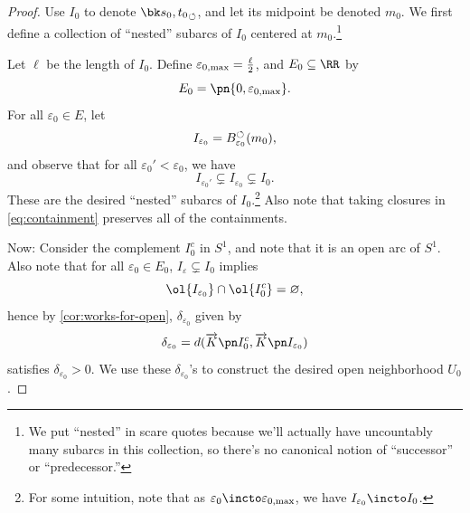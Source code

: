\begin{proof}
  Use $I_0$ to denote $\sbk{s_0, t_0}$, and let its midpoint be
  denoted $m_0$. We first define a collection of ``nested'' subarcs of
  $I_0$ centered at $m_0$.\footnote{We put ``nested'' in scare quotes
    because we'll actually have uncountably many subarcs in this
    collection, so there's no canonical notion of ``successor'' or
    ``predecessor.''}

  Let $\ell$ be the length of $I_0$. Define $\varepsilon_{0, {\rm
      max}} = \frac{\ell}{2}$, and $E_0 \subseteq \RR$ by
  \[
    E_0 = \pn{0, \varepsilon_{0, \rm max}}.
  \]
  For all $\varepsilon_0 \in E$, let
  \[
    I_{\varepsilon_0} = B^\circlearrowleft_{\varepsilon_0}(m_0),
  \]
  and observe that for all $\varepsilon_0' < \varepsilon_0$, we have
  \begin{equation}
    I_{\varepsilon_0'} \subsetneq I_{\varepsilon_0} \subsetneq
    I_0. \label{eq:containment}
  \end{equation}
  These are the desired ``nested'' subarcs of $I_0$.\footnote{For some
    intuition, note that as $\varepsilon_0 \incto \varepsilon_{0, \rm
      max}$, we have $I_{\varepsilon_0} \incto I_0$.} Also note that
  taking closures in \cref{eq:containment} preserves all of the
  containments.

  Now: Consider the complement $I_0^c$ in $S^1$, and note that it is
  an open arc of $S^1$. Also note that for all $\varepsilon_0 \in
  E_0$, $I_{\varepsilon} \subsetneq I_0$ implies
  \[
    \ol{I_{\varepsilon_0}} \cap \ol{I_0^c} = \varnothing,
  \]
  hence by \cref{cor:works-for-open}, $\delta_{\varepsilon_0}$ given
  by
  \[
    \delta_{\varepsilon_0} = d(\fim{K}{I_0^c},
    \fim{K}{I_{\varepsilon_0}})
  \]
  satisfies $\delta_{\varepsilon_0} > 0$. We use these
  $\delta_{\varepsilon_0}$'s to construct the desired open
  neighborhood $U_0$.


\end{proof}
